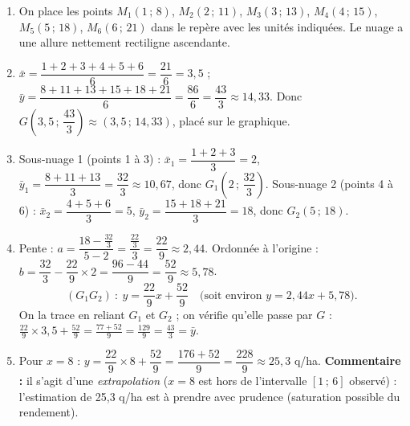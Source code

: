 \documentclass[11pt]{article}
\begin{document}
\begin{corrige}
\begin{enumerate}
\item On place les points $M_1(1\,;\,8)$, $M_2(2\,;\,11)$, $M_3(3\,;\,13)$, $M_4(4\,;\,15)$, $M_5(5\,;\,18)$, $M_6(6\,;\,21)$ dans le repère avec les unités indiquées. Le nuage a une allure nettement rectiligne ascendante.
\item $\bar{x}=\dfrac{1+2+3+4+5+6}{6}=\dfrac{21}{6}=3{,}5$ ; $\bar{y}=\dfrac{8+11+13+15+18+21}{6}=\dfrac{86}{6}=\dfrac{43}{3}\approx14{,}33$.
Donc $G\left(3{,}5\,;\,\dfrac{43}{3}\right)\approx(3{,}5\,;\,14{,}33)$, placé sur le graphique.
\item Sous-nuage 1 (points 1 à 3) : $\bar{x}_1=\dfrac{1+2+3}{3}=2$, $\bar{y}_1=\dfrac{8+11+13}{3}=\dfrac{32}{3}\approx10{,}67$, donc $G_1\left(2\,;\,\dfrac{32}{3}\right)$.
Sous-nuage 2 (points 4 à 6) : $\bar{x}_2=\dfrac{4+5+6}{3}=5$, $\bar{y}_2=\dfrac{15+18+21}{3}=18$, donc $G_2(5\,;\,18)$.
\item Pente : $a=\dfrac{18-\frac{32}{3}}{5-2}=\dfrac{\frac{22}{3}}{3}=\dfrac{22}{9}\approx2{,}44$.
Ordonnée à l'origine : $b=\dfrac{32}{3}-\dfrac{22}{9}\times2=\dfrac{96-44}{9}=\dfrac{52}{9}\approx5{,}78$.
\[
(G_1G_2)\ :\ y=\frac{22}{9}x+\frac{52}{9}\quad\text{(soit environ } y=2{,}44x+5{,}78\text{)}.
\]
On la trace en reliant $G_1$ et $G_2$ ; on vérifie qu'elle passe par $G$ : $\frac{22}{9}\times3{,}5+\frac{52}{9}=\frac{77+52}{9}=\frac{129}{9}=\frac{43}{3}=\bar{y}$.
\item Pour $x=8$ : $y=\dfrac{22}{9}\times8+\dfrac{52}{9}=\dfrac{176+52}{9}=\dfrac{228}{9}\approx25{,}3$ q/ha.
\textbf{Commentaire :} il s'agit d'une \emph{extrapolation} ($x=8$ est hors de l'intervalle $[1\,;\,6]$ observé) : l'estimation de 25,3 q/ha est à prendre avec prudence (saturation possible du rendement).
\end{enumerate}
\end{corrige}
\end{document}
